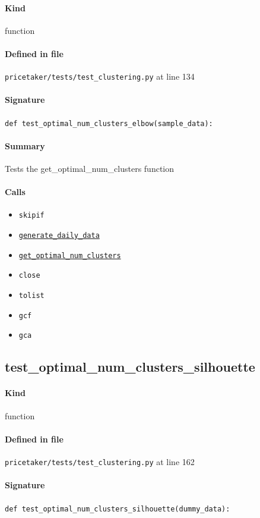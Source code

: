 \documentclass[11pt]{report}
\begin{document}
\paragraph{Kind} function
\paragraph{Defined in file} \texttt{pricetaker/tests/test\_clustering.py} at line 134
\paragraph{Signature} \texttt{def test\_optimal\_num\_clusters\_elbow(sample\_data):}
\paragraph{Summary} Tests the get\_optimal\_num\_clusters function
\paragraph{Calls}
\begin{itemize}[leftmargin=*]
  \item \texttt{skipif}
  \item \hyperref[def:pricetaker-clustering.py:generate_daily_data:L35]{\texttt{generate\_daily\_data}}
  \item \hyperref[def:pricetaker-clustering.py:get_optimal_num_clusters:L142]{\texttt{get\_optimal\_num\_clusters}}
  \item \texttt{close}
  \item \texttt{tolist}
  \item \texttt{gcf}
  \item \texttt{gca}
\end{itemize}
\subsection{test\_optimal\_num\_clusters\_silhouette}
\label{def:pricetaker-tests-test_clustering.py:test_optimal_num_clusters_silhouette:L162}
\paragraph{Kind} function
\paragraph{Defined in file} \texttt{pricetaker/tests/test\_clustering.py} at line 162
\paragraph{Signature} \texttt{def test\_optimal\_num\_clusters\_silhouette(dummy\_data):}
\end{document}
